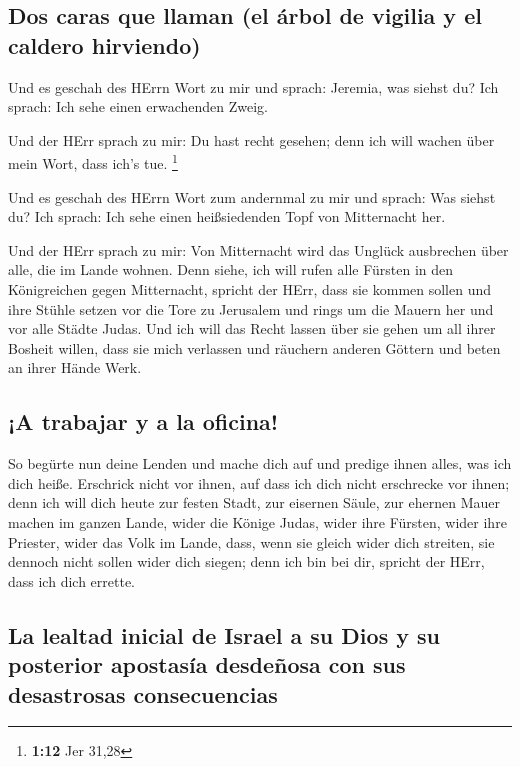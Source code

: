 \hypertarget{dos-caras-que-llaman-el-uxe1rbol-de-vigilia-y-el-caldero-hirviendo}{%
\subsection{Dos caras que llaman (el árbol de vigilia y el caldero
hirviendo)}\label{dos-caras-que-llaman-el-uxe1rbol-de-vigilia-y-el-caldero-hirviendo}}

 Und es geschah des HErrn Wort zu mir und sprach:
Jeremia, was siehst du? Ich sprach: Ich sehe einen erwachenden Zweig.

 Und der HErr sprach zu mir: Du hast recht gesehen; denn
ich will wachen über mein Wort, dass ich's tue. \footnote{\textbf{1:12}
  Jer 31,28}

 Und es geschah des HErrn Wort zum andernmal zu mir und
sprach: Was siehst du? Ich sprach: Ich sehe einen heißsiedenden Topf von
Mitternacht her.

 Und der HErr sprach zu mir: Von Mitternacht wird das
Unglück ausbrechen über alle, die im Lande wohnen.  Denn
siehe, ich will rufen alle Fürsten in den Königreichen gegen
Mitternacht, spricht der HErr, dass sie kommen sollen und ihre Stühle
setzen vor die Tore zu Jerusalem und rings um die Mauern her und vor
alle Städte Judas.  Und ich will das Recht lassen über
sie gehen um all ihrer Bosheit willen, dass sie mich verlassen und
räuchern anderen Göttern und beten an ihrer Hände Werk.

\hypertarget{a-trabajar-y-a-la-oficina}{%
\subsection{¡A trabajar y a la
oficina!}\label{a-trabajar-y-a-la-oficina}}

 So begürte nun deine Lenden und mache dich auf und
predige ihnen alles, was ich dich heiße. Erschrick nicht vor ihnen, auf
dass ich dich nicht erschrecke vor ihnen;  denn ich will
dich heute zur festen Stadt, zur eisernen Säule, zur ehernen Mauer
machen im ganzen Lande, wider die Könige Judas, wider ihre Fürsten,
wider ihre Priester, wider das Volk im Lande,  dass, wenn
sie gleich wider dich streiten, sie dennoch nicht sollen wider dich
siegen; denn ich bin bei dir, spricht der HErr, dass ich dich errette.

\hypertarget{la-lealtad-inicial-de-israel-a-su-dios-y-su-posterior-apostasuxeda-desdeuxf1osa-con-sus-desastrosas-consecuencias}{%
\subsection{La lealtad inicial de Israel a su Dios y su posterior
apostasía desdeñosa con sus desastrosas
consecuencias}\label{la-lealtad-inicial-de-israel-a-su-dios-y-su-posterior-apostasuxeda-desdeuxf1osa-con-sus-desastrosas-consecuencias}}

